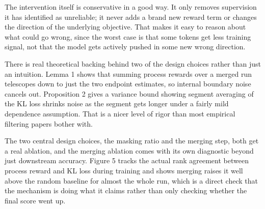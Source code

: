 The intervention itself is conservative in a good way. It only removes supervision it has identified as unreliable; it never adds a brand new reward term or changes the direction of the underlying objective. That makes it easy to reason about what could go wrong, since the worst case is that some tokens get less training signal, not that the model gets actively pushed in some new wrong direction.

There is real theoretical backing behind two of the design choices rather than just an intuition. Lemma 1 shows that summing process rewards over a merged run telescopes down to just the two endpoint estimates, so internal boundary noise cancels out. Proposition 2 gives a variance bound showing segment averaging of the KL loss shrinks noise as the segment gets longer under a fairly mild dependence assumption. That is a nicer level of rigor than most empirical filtering papers bother with.

The two central design choices, the masking ratio and the merging step, both get a real ablation, and the merging ablation comes with its own diagnostic beyond just downstream accuracy. Figure 5 tracks the actual rank agreement between process reward and KL loss during training and shows merging raises it well above the random baseline for almost the whole run, which is a direct check that the mechanism is doing what it claims rather than only checking whether the final score went up.

